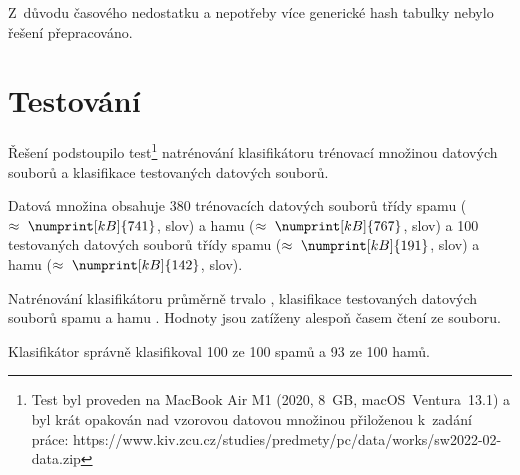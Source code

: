 \documentclass[a4paper, 12pt]{report}
\begin{document}
Z~důvodu časového nedostatku a nepotřeby více generické hash tabulky nebylo
řešení přepracováno.

\section{Testování}

Řešení podstoupilo test\footnote{Test byl proveden na MacBook Air M1 
(2020, 8~GB, macOS~Ventura~13.1) a byl krát opakován nad 
vzorovou datovou množinou přiloženou k~zadání práce: 
https://www.kiv.zcu.cz/studies/predmety/pc/data/works/sw2022-02-data.zip} 
natrénování klasifikátoru trénovací množinou datových souborů a 
klasifikace testovaných datových souborů.

Datová množina obsahuje 380 trénovacích datových souborů třídy spamu
($\approx~\numprint[kB]{741}$,  slov) a hamu
($\approx~\numprint[kB]{767}$,  slov) a 
100 testovaných datových souborů třídy spamu
($\approx~\numprint[kB]{191}$,  slov) a hamu
($\approx~\numprint[kB]{142}$,  slov).

Natrénování klasifikátoru průměrně trvalo , 
klasifikace testovaných datových souborů spamu  a hamu 
. Hodnoty jsou zatíženy alespoň časem čtení ze souboru.

Klasifikátor správně klasifikoval 100 ze 100 spamů a 93 ze 100 hamů.
\end{document}
